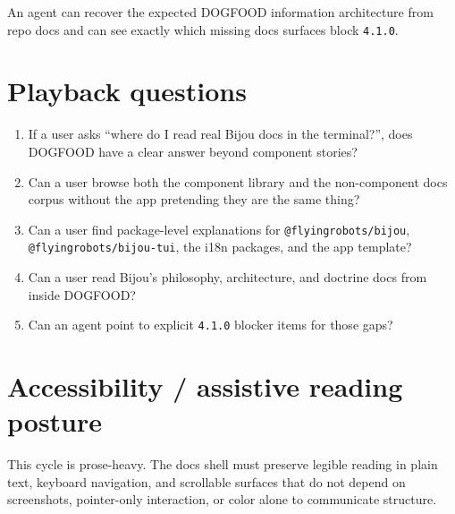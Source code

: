 An agent can recover the expected DOGFOOD information architecture from repo docs and can see exactly which missing docs surfaces block \texttt{4\allowbreak{}.\allowbreak{}1\allowbreak{}.\allowbreak{}0}.

\section{Playback questions}\label{record-082-playback-questions}

\begin{enumerate}
\def\labelenumi{\arabic{enumi}.}
\tightlist
\item
  If a user asks ``where do I read real Bijou docs in the terminal?'', does DOGFOOD have a clear answer beyond component stories?
\item
  Can a user browse both the component library and the non-component docs corpus without the app pretending they are the same thing?
\item
  Can a user find package-level explanations for \texttt{@\allowbreak{}f\allowbreak{}l\allowbreak{}y\allowbreak{}i\allowbreak{}n\allowbreak{}g\allowbreak{}r\allowbreak{}o\allowbreak{}b\allowbreak{}o\allowbreak{}t\allowbreak{}s\allowbreak{}/\allowbreak{}b\allowbreak{}i\allowbreak{}j\allowbreak{}o\allowbreak{}u}, \texttt{@\allowbreak{}f\allowbreak{}l\allowbreak{}y\allowbreak{}i\allowbreak{}n\allowbreak{}g\allowbreak{}r\allowbreak{}o\allowbreak{}b\allowbreak{}o\allowbreak{}t\allowbreak{}s\allowbreak{}/\allowbreak{}b\allowbreak{}i\allowbreak{}j\allowbreak{}o\allowbreak{}u\allowbreak{}-\allowbreak{}t\allowbreak{}u\allowbreak{}i}, the i18n packages, and the app template?
\item
  Can a user read Bijou's philosophy, architecture, and doctrine docs from inside DOGFOOD?
\item
  Can an agent point to explicit \texttt{4\allowbreak{}.\allowbreak{}1\allowbreak{}.\allowbreak{}0} blocker items for those gaps?
\end{enumerate}

\section{Accessibility / assistive reading posture}\label{record-082-accessibility-assistive-reading-posture}

This cycle is prose-heavy. The docs shell must preserve legible reading in plain text, keyboard navigation, and scrollable surfaces that do not depend on screenshots, pointer-only interaction, or color alone to communicate structure.

